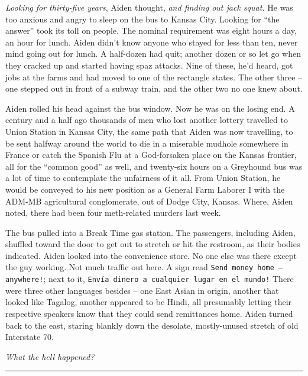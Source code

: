 \documentclass[11pt]{book}
\begin{document}
	\textit{Looking for thirty-five years}, Aiden thought, \textit{and finding out jack squat.} He was too anxious and angry to sleep on the bus to Kansas City. Looking for ``the answer'' took its toll on people. The nominal requirement was eight hours a day, an hour for lunch. Aiden didn't know anyone who stayed for less than ten, never mind going out for lunch. A half-dozen had quit; another dozen or so let go when they cracked up and started having spaz attacks. Nine of these, he'd heard, got jobs at the farms and had moved to one of the rectangle states. The other three -- one stepped out in front of a subway train, and the other two no one knew about.

	Aiden rolled his head against the bus window. Now he was on the losing end. A century and a half ago thousands of men who lost another lottery travelled to Union Station in Kansas City, the same path that Aiden was now travelling, to be sent halfway around the world to die in a miserable mudhole somewhere in France or catch the Spanish Flu at a God-forsaken place on the Kansas frontier, all for the ``common good'' as well, and twenty-six hours on a Greyhound bus was a lot of time to contemplate the unfairness of it all. From Union Station, he would be conveyed to his new position as a General Farm Laborer I with the ADM-MB agricultural conglomerate, out of Dodge City, Kansas. Where, Aiden noted, there had been four meth-related murders last week.
	
	The bus pulled into a Break Time gas station. The passengers, including Aiden, shuffled toward the door to get out to stretch or hit the restroom, as their bodies indicated. Aiden looked into the convenience store. No one else was there except the guy working. Not much traffic out here. A sign read \texttt{Send money home -- anywhere!}; next to it, \texttt{\textexclamdown Envía dinero a cualquier lugar en el mundo!} There were three other languages besides -- one East Asian in origin, another that looked like Tagalog, another appeared to be Hindi, all presumably letting their respective speakers know that they could send remittances home. Aiden turned back to the east, staring blankly down the desolate, mostly-unused stretch of old Interstate 70.
	
	\textit{What the hell happened?}
	
	\vspace{0.5cm}
	\hrule
	\vspace{0.5cm}
	
\end{document}
